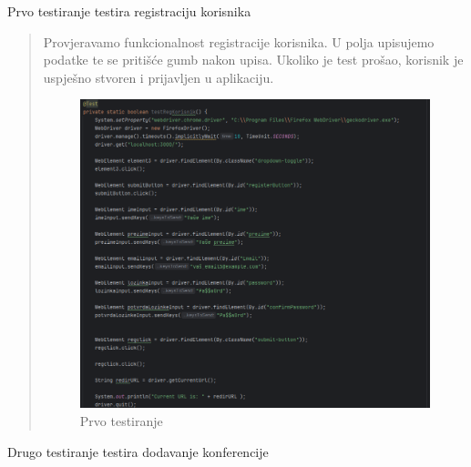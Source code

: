 			
			\begin{packed_enum}
				\item Prvo testiranje testira registraciju korisnika
				
				\begin{quote}
					Provjeravamo funkcionalnost registracije korisnika. U polja upisujemo podatke te se pritišće gumb nakon upisa. Ukoliko je test prošao, korisnik je uspješno stvoren i prijavljen u aplikaciju.
					\begin{figure}[H]
						\includegraphics[width=\textwidth]{slike/Selenium1.png} %
						\caption{Prvo testiranje}
						\label{fig:Selenium1} %
					\end{figure}
				\end{quote}
				
				
				\item Drugo testiranje testira dodavanje konferencije
				

\end{packed_enum}
